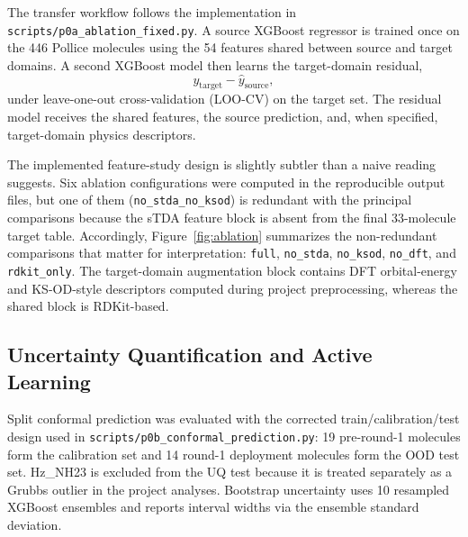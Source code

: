 \documentclass[journal=jcisd8,manuscript=article]{achemso}
\begin{document}
The transfer workflow follows the implementation in \texttt{scripts/p0a\_ablation\_fixed.py}. A source XGBoost regressor\cite{Chen2016} is trained once on the 446 Pollice molecules using the 54 features shared between source and target domains. A second XGBoost model then learns the target-domain residual,
\begin{equation}
  y_\mathrm{target}-\hat{y}_\mathrm{source},
\end{equation}
under leave-one-out cross-validation (LOO-CV) on the target set. The residual model receives the shared features, the source prediction, and, when specified, target-domain physics descriptors.

The implemented feature-study design is slightly subtler than a naive reading suggests. Six ablation configurations were computed in the reproducible output files, but one of them (\texttt{no\_stda\_no\_ksod}) is redundant with the principal comparisons because the sTDA feature block is absent from the final 33-molecule target table. Accordingly, Figure~\ref{fig:ablation} summarizes the non-redundant comparisons that matter for interpretation: \texttt{full}, \texttt{no\_stda}, \texttt{no\_ksod}, \texttt{no\_dft}, and \texttt{rdkit\_only}. The target-domain augmentation block contains DFT orbital-energy and KS-OD-style descriptors computed during project preprocessing, whereas the shared block is RDKit-based.

\subsection{Uncertainty Quantification and Active Learning}

Split conformal prediction\cite{Vovk2005} was evaluated with the corrected train/calibration/test design used in \texttt{scripts/p0b\_conformal\_prediction.py}: 19 pre-round-1 molecules form the calibration set and 14 round-1 deployment molecules form the OOD test set. Hz\_NH23 is excluded from the UQ test because it is treated separately as a Grubbs outlier in the project analyses. Bootstrap uncertainty uses 10 resampled XGBoost ensembles and reports interval widths via the ensemble standard deviation.
\end{document}
